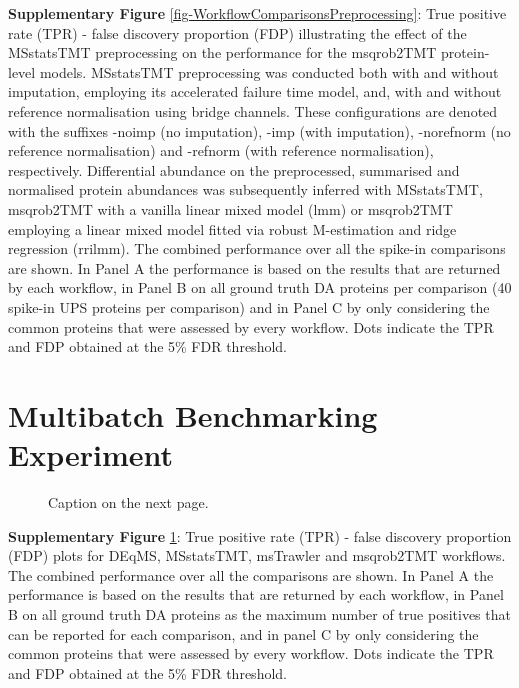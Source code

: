 \documentclass[
  letterpaper,
  DIV=11,
  numbers=noendperiod]{scrartcl}
\begin{document}
\textbf{Supplementary Figure }
\ref{fig-WorkflowComparisonsPreprocessing}: True positive rate (TPR) -
false discovery proportion (FDP) illustrating the effect of the
MSstatsTMT preprocessing on the performance for the msqrob2TMT
protein-level models. MSstatsTMT preprocessing was conducted both with
and without imputation, employing its accelerated failure time model,
and, with and without reference normalisation using bridge channels.
These configurations are denoted with the suffixes -noimp (no
imputation), -imp (with imputation), -norefnorm (no reference
normalisation) and -refnorm (with reference normalisation),
respectively. Differential abundance on the preprocessed, summarised and
normalised protein abundances was subsequently inferred with MSstatsTMT,
msqrob2TMT with a vanilla linear mixed model (lmm) or msqrob2TMT
employing a linear mixed model fitted via robust M-estimation and ridge
regression (rrilmm). The combined performance over all the spike-in
comparisons are shown. In Panel A the performance is based on the
results that are returned by each workflow, in Panel B on all ground
truth DA proteins per comparison (40 spike-in UPS proteins per
comparison) and in Panel C by only considering the common proteins that
were assessed by every workflow. Dots indicate the TPR and FDP obtained
at the 5\% FDR threshold.

\section*{Multibatch Benchmarking Experiment}

\begin{figure}[H]


\caption{\label{fig-WorkflowComparisonsSpikein2ALL}Caption on the next
page.}

\end{figure}%

\textbf{Supplementary Figure } \ref{fig-WorkflowComparisonsSpikein2ALL}:
True positive rate (TPR) - false discovery proportion (FDP) plots for
DEqMS, MSstatsTMT, msTrawler and msqrob2TMT workflows. The combined
performance over all the comparisons are shown. In Panel A the
performance is based on the results that are returned by each workflow,
in Panel B on all ground truth DA proteins as the maximum number of true
positives that can be reported for each comparison, and in panel C by
only considering the common proteins that were assessed by every
workflow. Dots indicate the TPR and FDP obtained at the 5\% FDR
threshold.
\end{document}
